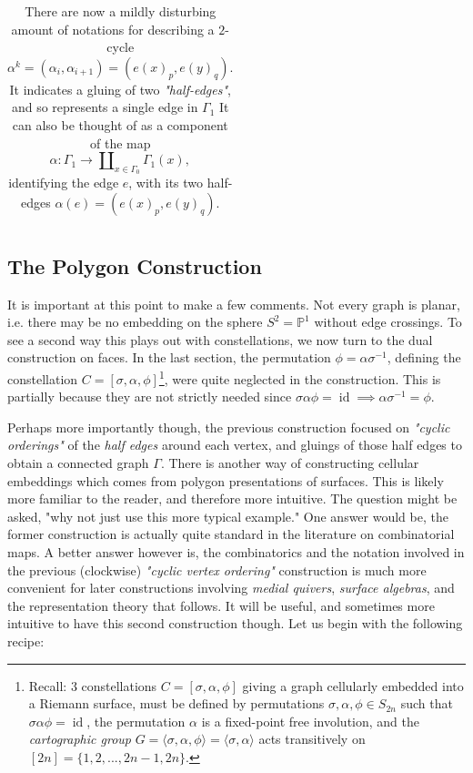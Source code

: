 \documentclass[11pt,oneside]{amsbook}
\numberwithin{equation}{section}
\theoremstyle{plain}
\theoremstyle{definition}
\theoremstyle{remark}
\newcommand{\sidenote}[1]{\footnote{#1}}
\DeclareMathOperator{\id}{\mathrm{id}}
\newcommand{\PP}{\mathbb{P}}
\newcommand{\la}{\langle}
\newcommand{\ra}{\rangle}
\begin{document}
\begin{table}
\begin{tabular}{l c c c c c}
			\bottomrule %
		\end{tabular}
		\caption{There are now a mildly disturbing amount of notations for describing a $2$-cycle \[ \alpha^k = (\alpha_i, \alpha_{i+1}) = (e(x)_p, e(y)_q).\] It indicates a gluing of two \textit{"half-edges"}, and so represents a single edge in $\Gamma_1$ It can also be thought of as a component of the map \[ \alpha: \Gamma_1 \to \amalg_{x \in \Gamma_0}\Gamma_1(x),\] identifying the edge $e$, with its two half-edges $\alpha(e) = (e(x)_p, e(y)_q)$.} %
		\label{tab:template_alt} %
	\end{table}
	
	
	\subsection{The Polygon Construction}
	It is important at this point to make a few comments. Not every graph is planar, i.e. there may be no embedding on the sphere $S^2 = \PP^1$ without edge crossings. To see a second way this plays out with constellations, we now turn to the dual construction on faces. In the last section, the permutation $\phi = \alpha \sigma^{-1}$, defining the constellation $C = [\sigma, \alpha, \phi]$\sidenote{Recall: $3$ constellations $C=[\sigma, \alpha, \phi]$ giving a graph cellularly embedded into a Riemann surface, must be defined by permutations $\sigma, \alpha, \phi \in S_{2n}$ such that $\sigma \alpha \phi = \id$, the permutation $\alpha$ is a fixed-point free involution, and the \textit{cartographic group} $G = \la \sigma, \alpha, \phi \ra = \la \sigma, \alpha \ra$ acts transitively on $[2n] = \{1, 2, ..., 2n-1, 2n\}$.}, were quite neglected in the construction. This is partially because they are not strictly needed since $\sigma \alpha \phi = \id \implies \alpha \sigma^{-1} = \phi$. 
	
	Perhaps more importantly though, the previous construction focused on \textit{"cyclic orderings"} of the \textit{half edges} around each vertex, and gluings of those half edges to obtain a connected graph $\Gamma$. There is another way of constructing cellular embeddings which comes from polygon presentations of surfaces. This is likely more familiar to the reader, and therefore more intuitive. The question might be asked, "why not just use this more typical example." One answer would be, the former construction is actually quite standard in the literature on combinatorial maps. A better answer however is, the combinatorics and the notation involved in the previous (clockwise) \textit{"cyclic vertex ordering"} construction is much more convenient for later constructions involving \textit{medial quivers}, \textit{surface algebras}, and the representation theory that follows. It will be useful, and sometimes more intuitive to have this second construction though. Let us begin with the following recipe:
	
\end{document}
